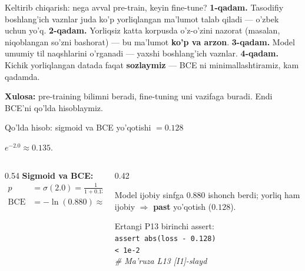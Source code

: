 \documentclass[aspectratio=169,11pt]{beamer}
\begin{document}
\begin{frame}{Keltirib chiqarish: nega avval pre-train, keyin fine-tune?}
  \textbf{1-qadam.} Tasodifiy boshlang'ich vaznlar juda ko'p yorliqlangan
  ma'lumot talab qiladi --- o'zbek uchun yo'q.
  \pause
  \textbf{2-qadam.} Yorliqsiz katta korpusda o'z-o'zini nazorat (masalan, niqoblangan
  so'zni bashorat) --- bu ma'lumot \textbf{ko'p va arzon}.
  \pause
  \textbf{3-qadam.} Model umumiy til naqshlarini o'rganadi --- yaxshi boshlang'ich
  vaznlar.
  \pause
  \textbf{4-qadam.} Kichik yorliqlangan datada faqat \textbf{sozlaymiz} --- BCE
  ni minimallashtiramiz, kam qadamda.
  \begin{tcolorbox}[okbox,top=2pt,bottom=2pt]
    \small \textbf{Xulosa:} pre-training bilimni beradi, fine-tuning uni
    vazifaga buradi. Endi BCE'ni qo'lda hisoblaymiz.
  \end{tcolorbox}
\end{frame}

%
\begin{frame}{Qo'lda hisob: sigmoid va BCE yo'qotishi $=0.128$}
  \begin{tcolorbox}[defbox,title={Ijobiy sharh, logit $z=2.0$, yorliq $y=1$}]
    \small $e^{-2.0}\approx 0.135$.
  \end{tcolorbox}
  \vspace{0.2em}
  \begin{columns}[T]
    \begin{column}{0.54\textwidth}
      \textbf{Sigmoid va BCE:}
      \begin{align*}
        p &= \sigma(2.0) = \tfrac{1}{1+0.135} = \tfrac{1}{1.135} \approx \mathbf{0.880}\\
        \mathrm{BCE} &= -\ln(0.880) \approx \mathbf{0.128}
      \end{align*}
    \end{column}
    \begin{column}{0.42\textwidth}
      \begin{tcolorbox}[okbox,top=2pt,bottom=2pt]
        \footnotesize
        Model ijobiy sinfga $0.880$ ishonch berdi; yorliq ham ijobiy
        $\Rightarrow$ \textbf{past} yo'qotish ($0.128$).
      \end{tcolorbox}
      \vspace{3pt}
      \footnotesize\color{halfgray}
      Ertangi P13 birinchi assert:\\
      \texttt{assert abs(loss - 0.128)}\\
      \texttt{\phantom{xx}< 1e-2}\\
      \textit{\# Ma'ruza L13 [I1]-slayd}
    \end{column}
  \end{columns}
\end{frame}
\end{document}

